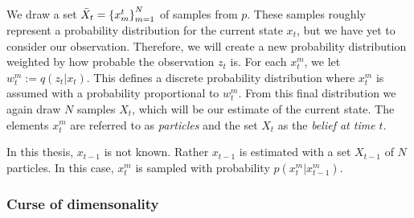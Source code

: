 

We draw a set $\bar{X}_t = \left\{x_{m}^{t}\right\}_{m=1}^{N}$ of samples from $p$. These samples roughly represent a probability distribution for the current state $x_t$, but we have yet to consider our observation. Therefore, we will create a new probability distribution weighted by how probable the observation $z_t$ is. For each $x_t^m$, we let $w_t^m := q\left(z_t | x_t\right)$. This defines a discrete probability distribution where $x_t^m$ is assumed with a probability proportional to $w_t^m$. From this final distribution we again draw $N$ samples $X_t$, which will be our estimate of the current state. The elements $x_t^m$ are referred to as \emph{particles} and the set $X_t$ as the \emph{belief at time $t$}.

In this thesis, $x_{t-1}$ is not known. Rather $x_{t-1}$ is estimated with a set $X_{t-1}$ of $N$ particles. In this case, $x_t^m$ is sampled with probability $p\left(x_t^m | x_{t-1}^m\right)$.



\subsubsection{Curse of dimensonality}




